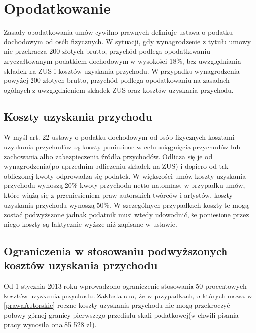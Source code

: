 \section[Opodatkowanie][Opodatkowanie]{Opodatkowanie}
Zasady opodatkowania umów cywilno-prawnych definiuje ustawa o podatku dochodowym od osób fizycznych\cite{TODO}. W sytuacji, gdy wynagrodzenie z tytułu umowy nie przekracza 200 złotych brutto, przychód podlega opodatkowaniu zryczałtowanym podatkiem dochodowym w wysokości 18\%, bez uwzględniania składek na ZUS i kosztów uzyskania przychodu.
W przypadku wynagrodzenia powyżej 200 złotych brutto, przychód podlega opodatkowaniu na zasadach ogólnych z uwzględnieniem składek ZUS oraz kosztów uzyskania przychodu.

\subsection[Koszty uzyskania przychodu][Koszty uzyskania przychodu]{Koszty uzyskania przychodu}
W myśl art. 22 ustawy o podatku dochodowym od osób fizycznych\cite{TODO} kosztami uzyskania przychodów są koszty poniesione w celu osiągnięcia przychodów lub zachowania albo zabezpieczenia źródła przychodów. Odlicza się je od wynagrodzenia(po uprzednim odliczeniu składek na ZUS) i dopiero od tak obliczonej kwoty odprowadza się podatek. W większości umów koszty uzyskania przychodu wynoszą 20\% kwoty przychodu netto natomiast w przypadku umów, które wiążą się z przeniesieniem praw autorskich twórców i artystów, koszty uzyskania przychodu wynoszą 50\%. W szczególnych przypadkach koszty te mogą zostać podwyższone jadnak podatnik musi wtedy udowodnić, że poniesione przez niego koszty są faktycznie wyższe niż zapisane w ustawie.

\subsection[Ograniczenia w stosowaniu podwyższonych kosztów uzyskania przychodu][Ograniczenia w stosowaniu podwyższonych kosztów uzyskania przychodu]{Ograniczenia w stosowaniu podwyższonych kosztów uzyskania przychodu}
Od 1 stycznia 2013 roku wprowadzono ograniczenie stosowania 50-procentowych kosztów uzyskania przychodu. Zakłada ono, że  w przypadkach, o których mowa w \ref{prawaAutorskie} roczne koszty uzyskania przychodu nie mogą przekroczyć połowy górnej granicy pierwszego przediału skali podatkowej(w chwili pisania pracy wynosiła ona 85 528 zł).

